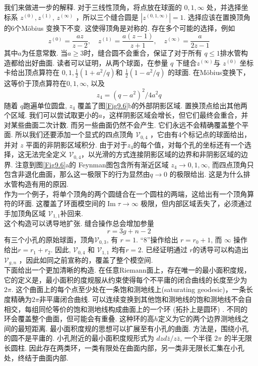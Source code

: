 我们来做进一步的解释. 对于三线性顶角，将点放在球面的 $0,1, \infty$ 处，并选择坐标系 $z^{(0)}, z^{(1)}$, $z^{(\infty)}$ ，所以三个缝合圆是 $\left|z^{(0,1, \infty)}\right|=1$. 选择应该在置换顶角的6个Möbius 变换下不变. 这使得顶角是对称的. 存在多个可能的选择，例如
\begin{equation}
	z^{(0)}=\frac{a z}{z-2}, \quad z^{(1)}=\frac{a(z-1)}{z+1}, \quad z^{(\infty)}=\frac{a}{2 z-1}
\end{equation}
其中$a$为任意常数. 当$a \geq 3$时，缝合圆不会重合，保证了对于所有 $q \leq 1$排水管构造都给出好曲面. 读者可以证明，从两个球面，在参量 $q$ 下缝合$z^{(\infty)}$与 $z^{(0)}$ 坐标卡给出顶点算符在 $0,1, \frac{1}{2}\left(1+a^{2} / q\right)$和 $\frac{1}{2}\left(1-a^{2} / q\right) $ 的球面. 在Möbius变换下，这等价于顶点算符在$0,1, \infty$, 以及
\begin{equation}
	z_{4}=\left(q-a^{2}\right)^{2} / 4 a^{2} q
\end{equation}
随着 $q$跑遍单位圆盘, $z_{4}$ 覆盖了图\ref{Fig9.6}b的外部阴影区域. 置换顶点给出其他两个区域. 我们可以尝试取更小的$a$，这样阴影区域会增长，但它们最终会重合，并对某些曲面二次计数. 而另一些曲面仍然不会产生. 它们永远不会精确覆盖整个平面. 所以我们还要添加一个显式的四点顶角 $\mathscr{V}_{0,4}$ ，它由有4个标记点的球面给出，并对 $z$ 平面的非阴影区域积分. 由于对于$z_{4} $的每个值，对每个孔的坐标还有一个选择，这无法完全定义 $\mathscr{V}_{0,4}$，以光滑的方式连接阴影区域的边界和非阴影区域的边界. 注意到图\ref{Fig9.6}a的 Feynman图包含所有渐近区域 $z_{4} \rightarrow 0,1, \infty$, 而四点顶角只包含非退化曲面，那么这一极限下的行为显然由$q \rightarrow 0$ 的极限给出. 这是为什么排水管构造有用的原因.\\
作为一个例子，将单个顶角的两个圆缝合在一个圆柱的两端，这给出有一个顶角算符的环面. 这覆盖了环面模空间的$\operatorname{Im} \tau \rightarrow \infty$ 极限，但内部区域丢失了，必须通过手加顶角区域 $\mathscr{V}_{1,1}$补回来.\\
这个构造可以诱导地扩张. 缝合操作总会增加参量
\begin{equation}
	r=3 g+n-2
\end{equation}
有三个小孔的原始球面，顶角$\mathscr{V}_{0,3}$, 有 $r=1$. “8”操作给出 $r=r_{0}+1$, 而 $\infty$ 操作给出$r=r_{1}+r_{2}$. 因此, $\mathscr{V}_{0,4}$ 和 $\mathscr{V}_{1,1}$ 均有$r=2$. 已经证明通过 $r$的诱导可以构造出 $\mathscr{V}_{g, n}$ ，因此如同之前宣称的，覆盖了整个模空间.\\
下面给出一个更加清晰的构造. 在任意Riemann面上，存在唯一的最小面积度规，它的定义是，最小面积的度规服从约束使得每个不平庸的闭合曲线的长度至少为 $2 \pi$. 这个曲面上的每个点至少处在一条饱和测地线上(saturating geodesic)，一条长度精确为$2 \pi$非平庸闭合曲线. 可以连续变换到其他饱和测地线的饱和测地线不会自相交，每组同伦等价的饱和测地线构成曲面上的一个环 (拓扑上是圆环) . 不同的环会覆盖整个曲面，但可能会有重叠. 这种环的高$h$定义为它的两个边界测地线之间的最短距离. 最小面积度规的思想可以扩展至有小孔的曲面. 方法是，围绕小孔的圆不是平庸的. 小孔附近的最小面积度规形式为 $d z d \bar{z} / z \bar{z}$, 一个半径 $2 \pi $ 的半无限长圆柱. 因此存在两类环，一类有限处在曲面内部，另一类非无限长汇集在小孔处，终结于曲面内部.\\
